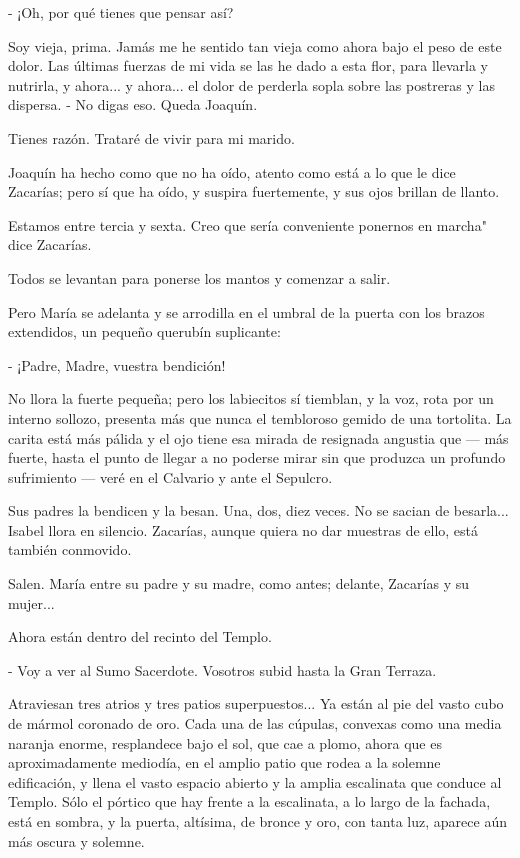 \documentclass[12pt, twoside, openright]{book} %
\begin{document}
- ¡Oh, por qué tienes que pensar así? 

Soy vieja, prima. Jamás me he sentido tan vieja como ahora bajo el peso de este dolor. Las últimas fuerzas de mi vida se las he dado a esta flor, para llevarla y nutrirla, y ahora... y ahora... el dolor de perderla sopla sobre las postreras y las dispersa. - No digas eso. Queda Joaquín. 

Tienes razón. Trataré de vivir para mi marido. 

Joaquín ha hecho como que no ha oído, atento como está a lo que le dice Zacarías; pero sí que ha oído, y suspira fuertemente, y sus ojos brillan de llanto. 

Estamos entre tercia y sexta. Creo que sería conveniente ponernos en marcha" dice Zacarías. 

Todos se levantan para ponerse los mantos y comenzar a salir. 

Pero María se adelanta y se arrodilla en el umbral de la puerta con los brazos extendidos, un pequeño querubín suplicante: 

- ¡Padre, Madre, vuestra bendición! 

No llora la fuerte pequeña; pero los labiecitos sí tiemblan, y la voz, rota por un interno sollozo, presenta más que nunca el tembloroso gemido de una tortolita. La carita está más pálida y el ojo tiene esa mirada de resignada angustia que — más fuerte, hasta el punto de llegar a no poderse mirar sin que produzca un profundo sufrimiento — veré en el Calvario y ante el Sepulcro. 

Sus padres la bendicen y la besan. Una, dos, diez veces. No se sacian de besarla... Isabel llora en silencio. Zacarías, aunque quiera no dar muestras de ello, está también conmovido. 

Salen. María entre su padre y su madre, como antes; delante, Zacarías y su mujer... 

Ahora están dentro del recinto del Templo. 

- Voy a ver al Sumo Sacerdote. Vosotros subid hasta la Gran Terraza. 

Atraviesan tres atrios y tres patios superpuestos... Ya están al pie del vasto cubo de mármol coronado de oro. Cada una de las cúpulas, convexas como una media naranja enorme, resplandece bajo el sol, que cae a plomo, ahora que es aproximadamente mediodía, en el amplio patio que rodea a la solemne edificación, y llena el vasto espacio abierto y la amplia escalinata que conduce al Templo. Sólo el pórtico que hay frente a la escalinata, a lo largo de la fachada, está en sombra, y la puerta, altísima, de bronce y oro, con tanta luz, aparece aún más oscura y solemne. 
\end{document}
